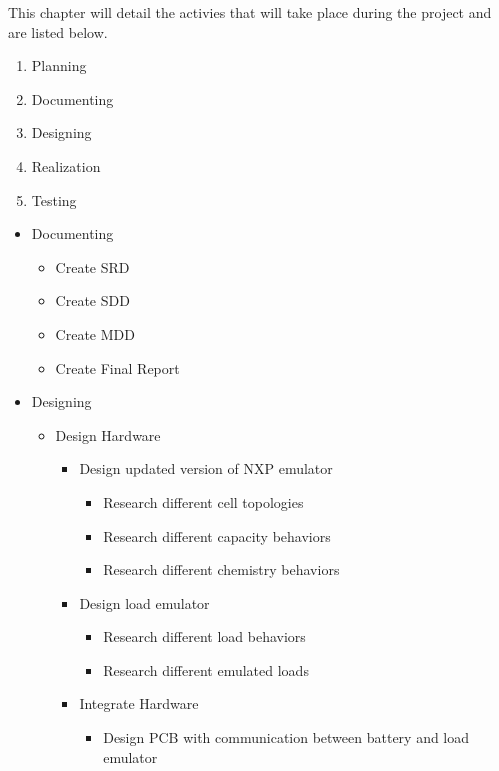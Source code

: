 This chapter will detail the activies that will take place during the project and are listed below. 

\begin{enumerate}
    \item Planning 
    \item Documenting
    \item Designing 
    \item Realization
    \item Testing
\end{enumerate}


\begin{itemize}
    \item Documenting 
    \begin{itemize}
    \item Create SRD
    \item Create SDD
    \item Create MDD
    \item Create Final Report
    \end{itemize}

    \item Designing
    \begin{itemize}
        \item Design Hardware
        \begin{itemize}
            \item Design updated version of NXP emulator
            \begin{itemize}
                \item Research different cell topologies 
                \item Research different capacity behaviors 
                \item Research different chemistry behaviors 
            \end{itemize}
            \item Design load emulator 
            \begin{itemize}
                \item Research different load behaviors 
                \item Research different emulated loads 
            \end{itemize}
            \item Integrate Hardware
            \begin{itemize}
                \item Design PCB with communication between battery and load emulator
            \end{itemize}
        

\end{itemize}
\end{itemize}
\end{itemize}
